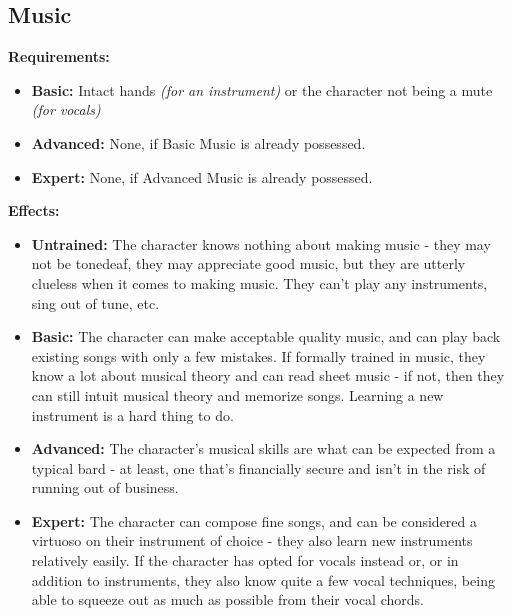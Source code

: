 \subsection{Music}
\begin{table}[!ht]
\centering
{}
\end{table}
\textbf{Requirements:}
\begin{itemize}
	\item \textbf{Basic:} Intact hands \textit{(for an instrument)} or the character not being a mute \textit{(for vocals)}
	\item \textbf{Advanced:} None, if Basic Music is already possessed.
	\item \textbf{Expert:} None, if Advanced Music is already possessed.
\end{itemize}
\textbf{Effects:}
\begin{itemize}
	\item \textbf{Untrained:} The character knows nothing about making music - they may not be tonedeaf, they may appreciate good music, but they are utterly clueless when it comes to making music. They can't play any instruments, sing out of tune, etc.
	\item \textbf{Basic:} The character can make acceptable quality music, and can play back existing songs with only a few mistakes. If formally trained in music, they know a lot about musical theory and can read sheet music - if not, then they can still intuit musical theory and memorize songs. Learning a new instrument is a hard thing to do.
	\item \textbf{Advanced:} The character's musical skills are what can be expected from a typical bard - at least, one that's financially secure and isn't in the risk of running out of business.
	\item \textbf{Expert:} The character can compose fine songs, and can be considered a virtuoso on their instrument of choice - they also learn new instruments relatively easily. If the character has opted for vocals instead or, or in addition to instruments, they also know quite a few vocal techniques, being able to squeeze out as much as possible from their vocal chords.
\end{itemize}\newpage
